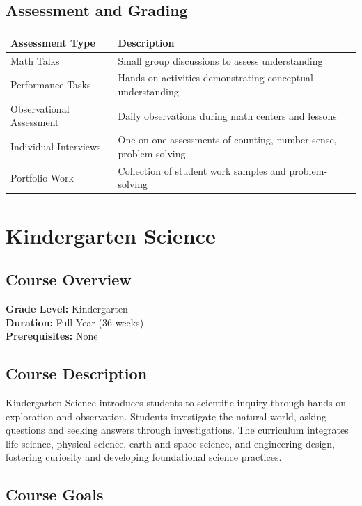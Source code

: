 \documentclass[11pt,letterpaper]{report}
\begin{document}
\section{Assessment and Grading}

\begin{center}
\begin{tabular}{|l|p{8cm}|}
\hline
\textbf{Assessment Type} & \textbf{Description} \\
\hline
Math Talks & Small group discussions to assess understanding \\
\hline
Performance Tasks & Hands-on activities demonstrating conceptual understanding \\
\hline
Observational Assessment & Daily observations during math centers and lessons \\
\hline
Individual Interviews & One-on-one assessments of counting, number sense, problem-solving \\
\hline
Portfolio Work & Collection of student work samples and problem-solving \\
\hline
\end{tabular}
\end{center}

\chapter{Kindergarten Science}

\section{Course Overview}

\textbf{Grade Level:} Kindergarten\\
\textbf{Duration:} Full Year (36 weeks)\\
\textbf{Prerequisites:} None

\section{Course Description}

Kindergarten Science introduces students to scientific inquiry through hands-on exploration and observation. Students investigate the natural world, asking questions and seeking answers through investigations. The curriculum integrates life science, physical science, earth and space science, and engineering design, fostering curiosity and developing foundational science practices.

\section{Course Goals}
\end{document}
